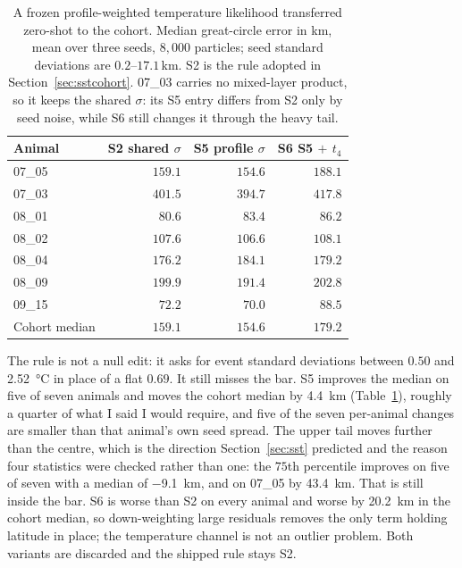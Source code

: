 \documentclass[conference]{IEEEtran}
\begin{document}
\begin{table}[t]
\caption{A frozen profile-weighted temperature likelihood transferred
zero-shot to the cohort. Median great-circle error in \si{\km}, mean over
three seeds, $8{,}000$ particles; seed standard deviations are
$0.2$--$17.1$\,\si{\km}. S2 is the rule adopted in
Section~\ref{sec:sstcohort}. 07\_03 carries no mixed-layer product, so it
keeps the shared $\sigma$: its S5 entry differs from S2 only by seed noise,
while S6 still changes it through the heavy tail.}
\label{tab:profile}
\centering
\small
\begin{tabular}{@{}lrrr@{}}
\toprule
Animal & S2 shared $\sigma$ & S5 profile $\sigma$ & S6 S5 $+$ $t_4$ \\
\midrule
07\_05 & $159.1$ & $154.6$ & $188.1$ \\
07\_03 & $401.5$ & $394.7$ & $417.8$ \\
08\_01 & $80.6$  & $83.4$  & $86.2$  \\
08\_02 & $107.6$ & $106.6$ & $108.1$ \\
08\_04 & $176.2$ & $184.1$ & $179.2$ \\
08\_09 & $199.9$ & $191.4$ & $202.8$ \\
09\_15 & $72.2$  & $70.0$  & $88.5$  \\
\midrule
Cohort median & $159.1$ & $154.6$ & $179.2$ \\
\bottomrule
\end{tabular}
\end{table}

The rule is not a null edit: it asks for event standard deviations between
$0.50$ and \SI{2.52}{\celsius} in place of a flat $0.69$. It still misses the
bar. S5 improves the median on five of seven animals and moves the cohort
median by \SI{4.4}{\km} (Table~\ref{tab:profile}), roughly a quarter of what I
said I would require, and five of the seven per-animal changes are smaller
than that animal's own seed spread. The upper tail moves further than the
centre, which is the direction Section~\ref{sec:sst} predicted and the reason
four statistics were checked rather than one: the $75$th percentile improves
on five of seven with a median of \SI{-9.1}{\km}, and on 07\_05 by
\SI{43.4}{\km}. That is still inside the bar. S6 is worse than S2 on every
animal and worse by \SI{20.2}{\km} in the cohort median, so down-weighting
large residuals removes the only term holding latitude in place; the
temperature channel is not an outlier problem. Both variants are discarded and
the shipped rule stays S2.
\end{document}
